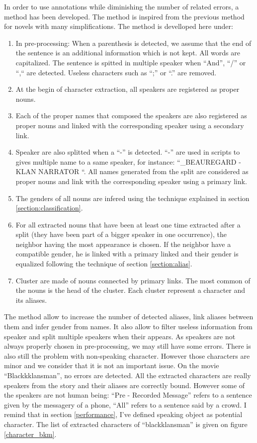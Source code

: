 \documentclass[a4paper, 12pt]{report}
\begin{document}
In order to use annotations while diminishing the number of related errors, a method has been developed. The method is inspired from the previous method for novels with many simplifications. The method is develloped here under:
\begin{enumerate}
\item In pre-processing: When a parenthesis is detected, we assume that the end of the sentence is an additional information which is not kept. All words are capitalized. The sentence is spitted in multiple speaker when ``And'', ``/''  or ``,`` are detected.   Useless characters such as ``;'' or ``.'' are removed.
\item At the begin of character extraction, all speakers are registered as proper nouns.
\item Each of the proper names that composed the speakers are also registered as proper nouns and linked with the corresponding speaker using a secondary link.
\item Speaker are also splitted when a ``-'' is detected. ``-'' are used in scripts to gives multiple name to a same speaker, for instance: ``_BEAUREGARD - KLAN NARRATOR ``. All names generated from the split are considered as proper nouns and link with the corresponding speaker using a primary link.
\item The genders of all nouns are infered using the technique explained in section \ref{section:classification}.
\item For all extracted nouns that have been at least one time extracted after a split (they have been part of a bigger speaker in one occurrence), the  neighbor having the most appearance is chosen. If the neighbor have a compatible gender, he is linked with a primary linked and their gender is equalized following the technique of section \ref{section:alias}.
\item Cluster are made of nouns connected by primary links. The most common of the nouns is the head of the cluster. Each cluster represent a character and its aliases.
\end{enumerate}

The method allow to increase the number of detected aliases, link aliases between them and infer gender from names. It also allow to filter useless information from speaker and split multiple speakers when their appears. 	As speakers are not always properly chosen in pre-processing, we may still have some errors. There is also still the problem with non-speaking character. However those characters are minor and we consider that it is not an important issue.  On the movie ``Blackkklansman'', no errors are detected. All the extracted characters are really speakers from the story and their aliases are correctly bound. However some of the speakers are not human being: ``Pre - Recorded Message'' refers to a sentence given by the messagery of a phone, ``All'' refers to a sentence said by a crowd. I remind that in section \ref{performance}, I've defined speaking object as potential character. The list of extracted characters of ``blackklansman'' is given on figure \ref{character_bkm}.\\
\end{document}
